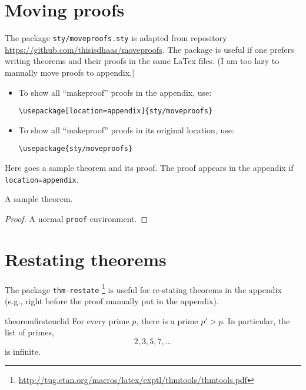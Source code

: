 \section{Moving proofs}

The package \texttt{sty/moveproofs.sty} is adapted from repository
\url{https://github.com/thisisdhaas/moveproofs}.
The package is useful if one prefers writing theorems and their proofs in the
same LaTex files.
(I am too lazy to manually move proofs to appendix.)

\begin{itemize}
\item To show all ``makeproof'' proofs in the appendix, use:
\begin{verbatim}
\usepackage[location=appendix]{sty/moveproofs}
\end{verbatim}
\item To show all ``makeproof'' proofs in its original location, use:
\begin{verbatim}
\usepackage{sty/moveproofs}
\end{verbatim}
\end{itemize}

Here goes a sample theorem and its proof.
The proof appears in the appendix if \texttt{location=appendix}.

\begin{theorem}\label{thm:sample}
  A sample theorem.
\end{theorem}


\begin{proof}
  A normal \texttt{proof} environment.
\end{proof}

\section{Restating theorems}

The package \texttt{thm-restate}
\footnote{\url{http://tug.ctan.org/macros/latex/exptl/thmtools/thmtools.pdf} }
is useful for re-stating theorems in the appendix (e.g., right before the proof
manually put in the appendix).

\begin{restatable}[Euclid]{theorem}{firsteuclid}
  \label{thm:euclid}%
  For every prime $p$, there is a prime $p'>p$.
  In particular, the list of primes,
  \begin{equation}\label{eq:1}
    2,3,5,7,\dots
  \end{equation}
  is infinite.
\end{restatable}


